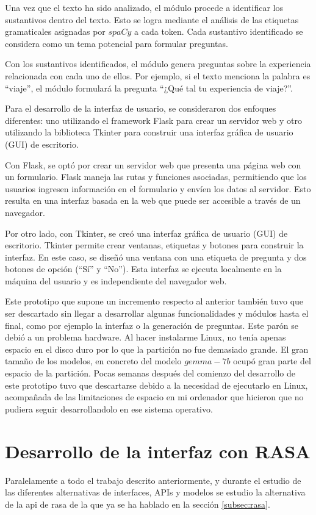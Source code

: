 Una vez que el texto ha sido analizado, el módulo procede a identificar los sustantivos dentro del texto. Esto se logra mediante el análisis de las etiquetas gramaticales asignadas por $spaCy$ a cada token. Cada sustantivo identificado se considera como un tema potencial para formular preguntas.

Con los sustantivos identificados, el módulo genera preguntas sobre la experiencia relacionada con cada uno de ellos. Por ejemplo, si el texto menciona la palabra es ``viaje'', el módulo formulará la pregunta ``¿Qué tal tu experiencia de viaje?''.

Para el desarrollo de la interfaz de usuario, se consideraron dos enfoques diferentes: uno utilizando el framework Flask para crear un servidor web y otro utilizando la biblioteca Tkinter para construir una interfaz gráfica de usuario (GUI) de escritorio.

Con Flask, se optó por crear un servidor web que presenta una página web con un formulario. Flask maneja las rutas y funciones asociadas, permitiendo que los usuarios ingresen información en el formulario y envíen los datos al servidor. Esto resulta en una interfaz basada en la web que puede ser accesible a través de un navegador.

Por otro lado, con Tkinter, se creó una interfaz gráfica de usuario (GUI) de escritorio. Tkinter permite crear ventanas, etiquetas y botones para construir la interfaz. En este caso, se diseñó una ventana con una etiqueta de pregunta y dos botones de opción (``Sí'' y ``No''). Esta interfaz se ejecuta localmente en la máquina del usuario y es independiente del navegador web.

Este prototipo que supone un incremento respecto al anterior también tuvo que ser descartado sin llegar a desarrollar algunas funcionalidades y módulos hasta el final, como por ejemplo la interfaz o la generación de preguntas. Este parón se debió a un problema hardware. Al hacer instalarme Linux, no tenía apenas espacio en el disco duro por lo que la partición no fue demasiado grande. El gran tamaño de los modelos, en concreto del modelo $gemma-7b$ ocupó gran parte del espacio de la partición. Pocas semanas después del comienzo del desarrollo de este prototipo tuvo que descartarse debido a la necesidad de ejecutarlo en Linux, acompañada de las limitaciones de espacio en mi ordenador que hicieron que no pudiera seguir desarrollandolo en ese sistema operativo. 

\section{Desarrollo de la interfaz con RASA}
\label{sec:RASA}
Paralelamente a todo el trabajo descrito anteriormente, y durante el estudio de las diferentes alternativas de interfaces, APIs y modelos se estudio la alternativa de la api de rasa de la que ya se ha hablado en la sección \ref{subsec:rasa}. 

